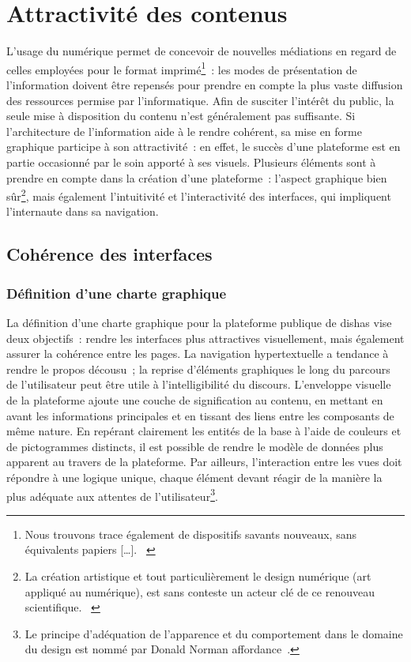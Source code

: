 \documentclass[a4paper,12pt,twoside]{book}
\newcommand{\p}{[\ldots]\xspace}
\newcommand{\g}[1]{\og#1~\fg}
\newcommand{\dishas}{\gls{dishas}\xspace}
\begin{document}
	\section{Attractivité des contenus}
L'usage du numérique permet de concevoir de nouvelles médiations en regard de celles employées pour le format imprimé\footnote{\g{Nous trouvons trace également de dispositifs savants nouveaux, sans équivalents papiers \p.} \cite[§~8]{rygielOrdinateurReseauEcriture2006}}~: les modes de présentation de l'information doivent être repensés pour prendre en compte la plus vaste diffusion des ressources permise par l'informatique. Afin de susciter l'intérêt du public, la seule mise à disposition du contenu n'est généralement pas suffisante. Si l'architecture de l'information aide à le rendre cohérent, sa mise en forme graphique participe à son attractivité~: en effet, le succès d'une plateforme est en partie occasionné par le soin apporté à ses visuels. Plusieurs éléments sont à prendre en compte dans la création d'une plateforme~: l'aspect graphique bien sûr\footnote{\g{La création artistique et tout particulièrement le design numérique (art appliqué au numérique), est sans conteste un acteur clé de ce renouveau scientifique.} \cite{massotDessinerActeursHumanites2018}}, mais également l'intuitivité et l'interactivité des interfaces, qui impliquent l'internaute dans sa navigation.

		\subsection{Cohérence des interfaces}
				\subsubsection{Définition d'une charte graphique}
La définition d'une charte graphique pour la plateforme publique de \dishas vise deux objectifs~: rendre les interfaces plus attractives visuellement, mais également assurer la cohérence entre les pages. La navigation hypertextuelle a tendance à rendre le propos décousu~; la reprise d'éléments graphiques le long du parcours de l'utilisateur peut être utile à l'intelligibilité du discours. L'enveloppe visuelle de la plateforme ajoute une couche de signification au contenu, en mettant en avant les informations principales et en tissant des liens entre les composants de même nature. En repérant clairement les entités de la base à l'aide de couleurs et de pictogrammes distincts, il est possible de rendre le modèle de données plus apparent au travers de la plateforme. Par ailleurs, l'interaction entre les vues doit répondre à une logique unique, chaque élément devant réagir de la manière la plus adéquate aux attentes de l'utilisateur\footnote{Le principe d'adéquation de l'apparence et du comportement dans le domaine du design est nommé par Donald Norman \g{affordance}.}.
\end{document}
